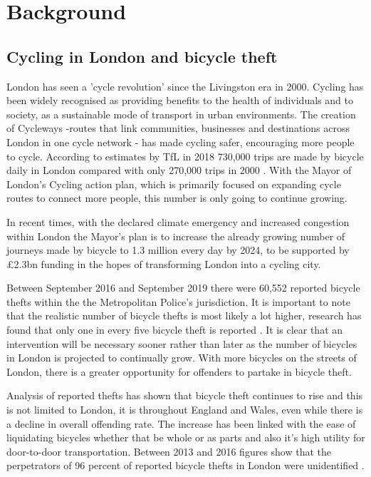 \documentclass[11pt]{informatics-report}
\begin{document}
\chapter{Background}

\section{Cycling in  London and bicycle theft}
London has seen a 'cycle revolution' since the Livingston era in 2000. Cycling has been widely recognised as providing benefits to the health of individuals and to society, as a sustainable mode of transport in urban environments. The creation of Cycleways -routes that link communities, businesses and destinations across London in one cycle network \cite{cycleway} - has made cycling safer, encouraging more people to cycle. According to estimates by TfL in 2018 730,000 trips are made by bicycle daily in London \cite{tfl} compared with only 270,000 trips in 2000 \cite{tfl2}. With the Mayor of London's Cycling action plan, which is primarily focused on expanding cycle routes to connect more people, this number is only going to continue growing. \par

In recent times, with the declared climate emergency and increased congestion within London the Mayor's plan is to increase the already growing number of journeys made by bicycle to 1.3 million every day by 2024, to be supported by £2.3bn funding\cite{actionplan} in the hopes of transforming London into a cycling city.\par

Between September 2016 and September 2019 there were 60,552 reported bicycle thefts within the the Metropolitan Police's jurisdiction. It is important to note that the realistic number of bicycle thefts is most likely a lot higher, research has found that only one in every five bicycle theft is reported \cite{ucl}. It is clear that an intervention will be necessary sooner rather than later as the number of bicycles in London is projected to continually grow. With more bicycles on the streets of London, there is a greater opportunity for offenders to partake in bicycle theft. \par

Analysis of reported thefts has shown that bicycle theft continues to rise and this is not limited to London, it is throughout England and Wales, even while there is a decline in overall offending rate. The increase has been linked with the ease of liquidating bicycles whether that be whole or as parts and also it's high utility for door-to-door transportation. Between 2013 and 2016 figures show that the perpetrators of 96 percent of reported bicycle thefts in London were unidentified \cite{environment}. \par
\end{document}
